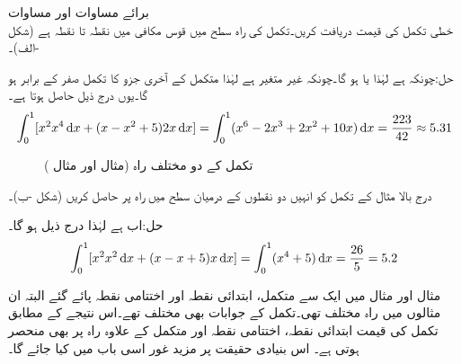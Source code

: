 \quad برائے مساوات  اور مساوات \\
خطی تکمل   کی قیمت دریافت کریں۔تکمل کی راہ سطح  میں قوس مکافی   میں نقطہ  تا نقطہ  ہے (شکل -الف)۔

حل:چونکہ  ہے لہٰذا  یا  ہو گا۔چونکہ  غیر متغیر ہے لہٰذا متکمل کے آخری جزو کا تکمل صفر کے برابر ہو گا۔یوں درج ذیل حاصل ہوتا ہے۔
\begin{align*}
\int_0^1[x^2 x^4\dif x+(x-x^2+5)2x\dif x]=\int_0^1 (x^6-2x^3+2x^2+10x)\dif x=\frac{223}{42}\approx 5.31
\end{align*}
%
\begin{figure}
\centering
{}
\caption{تکمل کے دو مختلف راہ (مثال  اور مثال )}
\label{شکل_خطی_تکمل_تکمل_مختلف_راہ}
\end{figure}
درج بالا مثال کے تکمل کو انہیں دو نقطوں کے درمیان  سطح  میں راہ  پر  حاصل کریں (شکل -ب)۔

حل:اب  ہے لہٰذا درج ذیل ہو گا۔
\begin{align*}
\int_0^1[x^2 x^2\dif x+(x-x+5)x\dif x]=\int_0^1 (x^4+5)\dif x=\frac{26}{5}=5.2
\end{align*}

مثال  اور مثال  میں ایک سے متکمل، ابتدائی نقطہ اور اختتامی نقطہ پائے گئے البتہ ان مثالوں میں راہ مختلف تھی۔تکمل کے جوابات بھی مختلف تھے۔اس نتیجے کے مطابق تکمل کی قیمت ابتدائی نقطہ، اختتامی نقطہ اور متکمل کے علاوہ راہ پر بھی منحصر ہوتی ہے۔ اس بنیادی حقیقت پر مزید غور اسی باب میں کیا جائے گا۔

